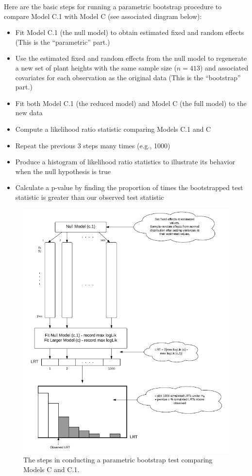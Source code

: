 \documentclass[
]{krantz}
\providecommand{\tightlist}{%
  \setlength{\itemsep}{0pt}\setlength{\parskip}{0pt}}
\begin{document}
Here are the basic steps for running a parametric bootstrap procedure to compare Model C.1 with Model C (see associated diagram below):

\begin{itemize}
\tightlist
\item
  Fit Model C.1 (the null model) to obtain estimated fixed and random effects (This is the ``parametric'' part.)
\item
  Use the estimated fixed and random effects from the null model to regenerate a new set of plant heights with the same sample size (\(n=413\)) and associated covariates for each observation as the original data (This is the ``bootstrap'' part.)
\item
  Fit both Model C.1 (the reduced model) and Model C (the full model) to the new data
\item
  Compute a likelihood ratio statistic comparing Models C.1 and C
\item
  Repeat the previous 3 steps many times (e.g., 1000)
\item
  Produce a histogram of likelihood ratio statistics to illustrate its behavior when the null hypothesis is true
\item
  Calculate a p-value by finding the proportion of times the bootstrapped test statistic is greater than our observed test statistic
\end{itemize}

\begin{figure}
\centering
\includegraphics{data/ParametricBootstrapDiagram.PNG}
\caption{The steps in conducting a parametric bootstrap test comparing Models C and C.1.}
\end{figure}
\end{document}
